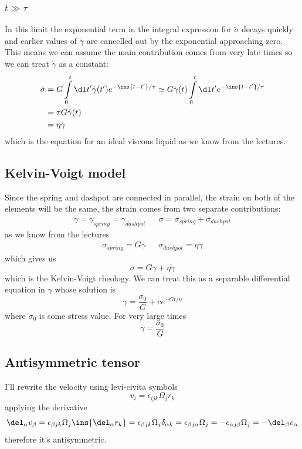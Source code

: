 \subsubsection{\(t\gg\tau\)}
In this limit the exponential term in the integral expression for \(\tilde{\sigma}\) decays quickly and earlier values of \(\dot{\gamma}\) are cancelled out by the exponential approaching zero. This means we can assume the main contribution comes from very late times so we can treat \(\dot{\gamma}\) as a constant:
\begin{align}
	\tilde{\sigma} &= G\int\limits_0^t \dl t' \dot{\gamma}(t') e^{-\ins{t-t'}/\tau} \simeq G\dot{\gamma}(t)\int\limits_0^t \dl t' e^{-\ins{t-t'}/\tau} \\
	&= \tau G \dot{\gamma}(t) \\
	&= \eta \dot{\gamma}
\end{align}
which is the equation for an ideal viscous liquid as we know from the lectures.
\subsection{Kelvin-Voigt model}
Since the spring and dashpot are connected in parallel, the strain on both of the elements will be the same, the strain comes from two separate contributions:
\begin{align}
	\gamma = \gamma_{spring} = \gamma_{dashpot} && \sigma = \sigma_{spring} + \sigma_{dashpot}
\end{align}
as we know from the lectures
\begin{align}
	\sigma_{spring} = G\gamma && \sigma_{dashpot} = \eta\dot{\gamma}
\end{align}
which gives us
\begin{equation}
	\sigma = G\gamma + \eta\dot{\gamma}
\end{equation}
which is the Kelvin-Voigt rheology. We can treat this as a separable differential equation in \(\gamma\) whose solution is
\begin{equation}
	\gamma = \frac{\sigma_0}{G} + ce^{-Gt/\eta}
\end{equation}
where \(\sigma_0\) is some stress value. For very large times
\begin{equation}
	\gamma = \frac{\sigma_0}{G}
\end{equation}
\subsection{Antisymmetric tensor}
I'll rewrite the velocity using levi-civita symbols
\begin{equation}
	v_i = \epsilon_{ijk}\Omega_j r_k
\end{equation}
applying the derivative
\begin{equation}
	\del_\alpha v_\beta =  \epsilon_{\beta jk}\Omega_j\ins{\del_\alpha r_k} = \epsilon_{\beta jk} \Omega_j \delta_{\alpha k} = \epsilon_{\beta j \alpha}\Omega_j = -\epsilon_{\alpha j \beta}\Omega_j = -\del_\beta v_\alpha
\end{equation}
therefore it's antisymmetric.